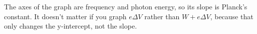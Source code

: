 The axes of the graph are frequency and photon energy, so its slope is Planck's constant.
It doesn't matter if you graph $e\Delta V$  rather than $W+e\Delta V$, because that only
changes the y-intercept, not the slope.
